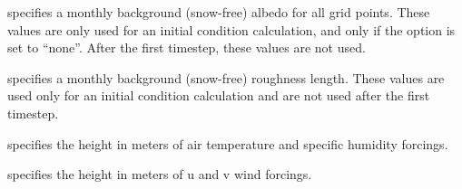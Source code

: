   specifies a monthly background
 (snow-free) albedo for all grid points.  These values are only
 used for an initial condition calculation, and only if the
  option is set to ``none''.  After
 the first timestep, these values are not used.

  specifies a monthly
 background (snow-free) roughness length.  These values are used
 only for an initial condition calculation and are not used after
 the first timestep.

  specifies the
 height in meters of air temperature and specific humidity forcings.

  specifies the
 height in meters of u and v wind forcings.
 

